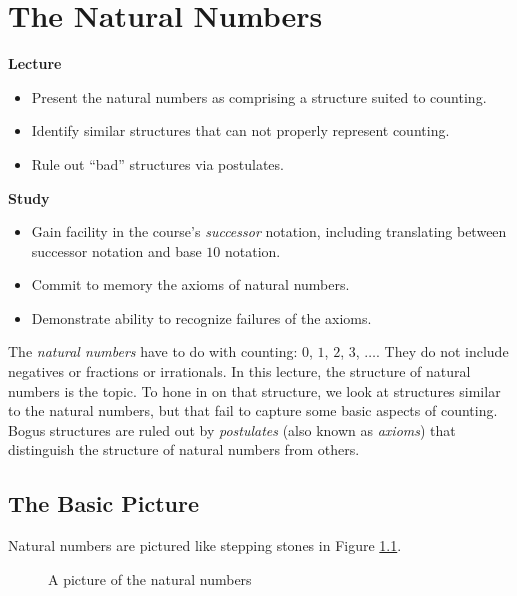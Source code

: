 \chapter{The Natural Numbers}\label{lec:NaturalNumbers}

\begin{goals}
\noindent \textbf{Lecture}
\begin{itemize}
\item Present the natural numbers as comprising a structure suited to counting.
\item Identify similar structures that can not properly represent counting.
\item Rule out ``bad'' structures via postulates.
\end{itemize}

\noindent \textbf{Study}
\begin{itemize}
\item Gain facility in the course's \emph{successor} notation, including
translating between successor notation and base $10$ notation.
\item Commit to memory the axioms of natural numbers.
\item Demonstrate ability to recognize failures of the axioms. 
\end{itemize}
\end{goals}

The \emph{natural numbers} have to do with counting: $0$, $1$, $2$, $3$, $\ldots$.
They do not include negatives or fractions or irrationals.
In this lecture, the structure of natural numbers is the topic.
To hone in on that structure, we look at structures similar to the natural numbers, but that fail to capture some basic aspects of counting. 
Bogus structures are ruled out by \emph{postulates} (also known as \emph{axioms}) that distinguish the structure of natural numbers from others.

\section{The Basic Picture}

Natural numbers are pictured like stepping stones in Figure \ref{fig:nat-numbers}.

\begin{figure}[h]
  \centering
  \caption{A picture of the natural numbers}
  \label{fig:nat-numbers}
\end{figure}

